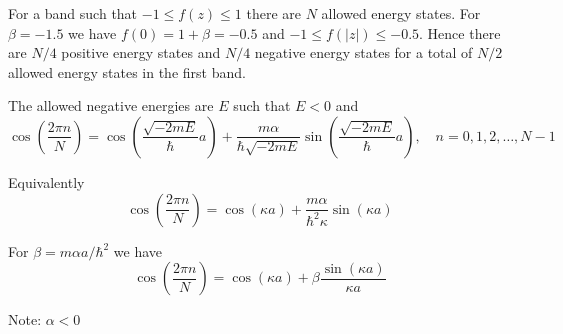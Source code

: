 


For a band such that $-1\le f(z)\le1$ there are $N$ allowed energy states.
For $\beta=-1.5$ we have $f(0)=1+\beta=-0.5$ and $-1\le f(|z|)\le-0.5$.
Hence there are $N/4$ positive energy states and $N/4$ negative energy states
for a total of $N/2$ allowed energy states in the first band.

\bigskip
The allowed negative energies are $E$ such that $E<0$ and
\begin{equation*}
\cos\left(\frac{2\pi n}{N}\right)
=\cos\left(\frac{\sqrt{-2mE}}{\hbar}a\right)
+\frac{m\alpha}{\hbar\sqrt{-2mE}}\sin\left(\frac{\sqrt{-2mE}}{\hbar}a\right),\quad
n=0,1,2,\ldots,N-1
\end{equation*}

Equivalently
\begin{equation*}
\cos\left(\frac{2\pi n}{N}\right)
=\cos\left(\kappa a\right)
+\frac{m\alpha}{\hbar^2\kappa}\sin\left(\kappa a\right)
\end{equation*}

For $\beta=m\alpha a/\hbar^2$ we have
\begin{equation*}
\cos\left(\frac{2\pi n}{N}\right)
=\cos\left(\kappa a\right)
+\beta\frac{\sin\left(\kappa a\right)}{\kappa a}
\end{equation*}

Note: $\alpha<0$


